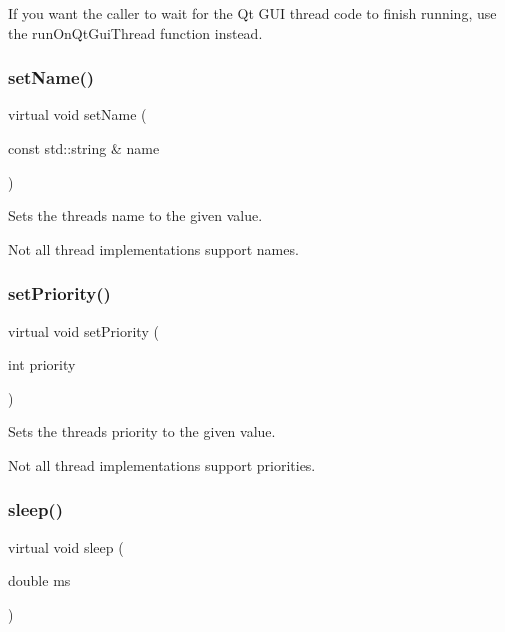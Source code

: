 If you want the caller to wait for the Qt G\+UI thread code to finish running, use the {\ttfamily run\+On\+Qt\+Gui\+Thread} function instead. \mbox{\label{classGThread_aa384b56425e77d3a0ea434eed3f37b53}} 
\subsubsection{\texorpdfstring{set\+Name()}{setName()}}
{\footnotesize\ttfamily virtual void set\+Name (\begin{DoxyParamCaption}\item[{const std\+::string \&}]{name }\end{DoxyParamCaption})\hspace{0.3cm}{\ttfamily [pure virtual]}}



Sets the thread\textquotesingle{}s name to the given value. 

Not all thread implementations support names. \mbox{\label{classGThread_aa64e7a844400aed800a4f223da0d03d8}} 
\subsubsection{\texorpdfstring{set\+Priority()}{setPriority()}}
{\footnotesize\ttfamily virtual void set\+Priority (\begin{DoxyParamCaption}\item[{int}]{priority }\end{DoxyParamCaption})\hspace{0.3cm}{\ttfamily [pure virtual]}}



Sets the thread\textquotesingle{}s priority to the given value. 

Not all thread implementations support priorities. \mbox{\label{classGThread_aa766a832061596446daffb891f42b71d}} 
\subsubsection{\texorpdfstring{sleep()}{sleep()}}
{\footnotesize\ttfamily virtual void sleep (\begin{DoxyParamCaption}\item[{double}]{ms }\end{DoxyParamCaption})\hspace{0.3cm}{\ttfamily [pure virtual]}}



